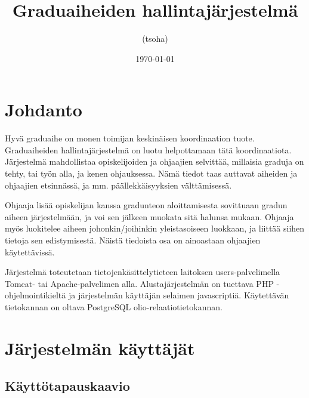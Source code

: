 \documentclass[11pt,a4paper,finnish,oneside]{article}
\begin{document}
\begin{titlepage}  
\title{Graduaiheiden hallintajärjestelmä}
\author{(tsoha)}
\date{\today}
\maketitle    
\tableofcontents
\end{titlepage}    


\section{Johdanto}

\begin{par}
Hyvä graduaihe on monen toimijan keskinäisen koordinaation tuote. Graduaiheiden hallintajärjestelmä on luotu helpottamaan tätä koordinaatiota. Järjestelmä mahdollistaa opiskelijoiden ja ohjaajien selvittää, millaisia graduja on tehty, tai työn alla, ja kenen ohjauksessa. Nämä tiedot taas auttavat aiheiden ja ohjaajien etsinnässä, ja mm. päällekkäisyyksien välttämisessä.
\end{par}\vspace{1em}

\begin{par}
Ohjaaja lisää opiskelijan kanssa gradunteon aloittamisesta sovittuaan gradun aiheen järjestelmään, ja voi sen jälkeen muokata sitä halunsa mukaan. Ohjaaja myös luokitelee aiheen johonkin/joihinkin yleistasoiseen luokkaan, ja liittää siihen tietoja sen edistymisestä. Näistä tiedoista osa on ainoastaan ohjaajien käytettävissä.
\end{par}\vspace{1em}

\begin{par}
Järjestelmä toteutetaan tietojenkäsittelytieteen laitoksen users-palvelimella Tomcat- tai Apache-palvelimen alla. Alustajärjestelmän on tuettava PHP -ohjelmointikieltä ja järjestelmän käyttäjän selaimen javascriptiä. Käytettävän tietokannan on oltava PostgreSQL olio-relaatiotietokannan.
\end{par}

\section{Järjestelmän käyttäjät}
\subsection{Käyttötapauskaavio}
\end{document}
